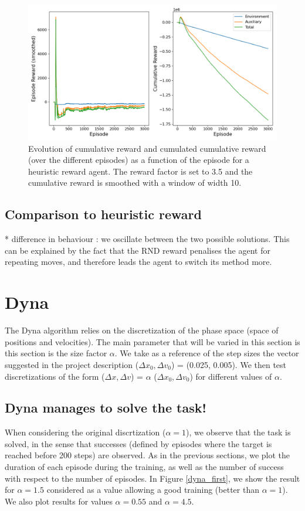 \documentclass[a4paper, 12pt,oneside]{article}
\begin{document}
        \begin{figure}[h!]
            \centering
            \vspace{0em}
            \includegraphics[width=.75\textwidth]{../runs/dqn_rnd/up-tau=1_r-fact=35.0/figs/reward}
            \caption{Evolution of cumulative reward and cumulated cumulative reward (over the different episodes) as a function of the episode for a heuristic reward agent. The reward factor is set to 3.5 and the cumulative reward is smoothed with a window of width 10.}
            \label{fig:dqn-rnd-r-fact=35-reward}
        \end{figure}
        \subsection{Comparison to heuristic reward}
        * difference in behaviour : we oscillate between the two possible solutions. This can be explained by the fact that the RND reward penalises the agent for repeating moves, and therefore leads the agent to switch its method more. 
    \section{Dyna}
        The Dyna algorithm relies on the discretization of the phase space (space of positions and velocities).
        The main parameter that will be varied in this section is this section is the size factor $\alpha$. We take as a reference of the step sizes the vector suggested in the project description ($\Delta x_0, \Delta v_0$) = (0.025, 0.005). We then test discretizations of the form ($\Delta x, \Delta v$) = $\alpha$ ($\Delta x_0, \Delta v_0$) 
        for different values of $\alpha$.

        \subsection{Dyna manages to solve the task!}
        When considering the original discrtization ($\alpha=1$), we observe that the task is solved, in the sense that successes (defined by episodes where the target is reached before 200 steps) are observed. 
        As in the previous sections, we plot the duration of each episode during the training, as well as the number of success with respect to the number of episodes. 
        In Figure \ref{dyna_first}, we show the result for $\alpha=1.5$ considered as a value allowing a good training (better than $\alpha=1$). We also plot results for values $\alpha=0.55$ and $\alpha=4.5$. 
        
\end{document}
